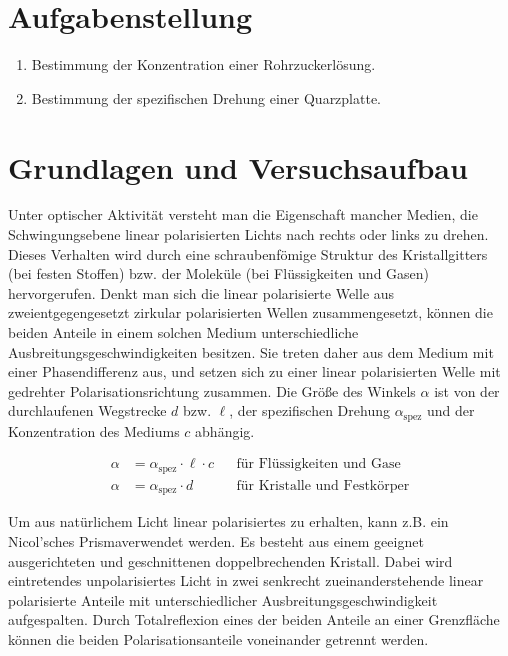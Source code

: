 \documentclass{article}
\newcommand{\as}{\alpha_\text{spez}}
\begin{document}
\parindent0cm




\pagestyle{fancy}

\section{Aufgabenstellung}

\begin{enumerate}
\item Bestimmung der Konzentration einer Rohrzuckerlösung.
\item Bestimmung der spezifischen Drehung einer Quarzplatte.
\end{enumerate}

\section{Grundlagen und Versuchsaufbau}

Unter optischer Aktivität versteht man die Eigenschaft mancher Medien, die Schwingungsebene linear polarisierten Lichts nach rechts oder links zu drehen. Dieses Verhalten wird durch eine schraubenfömige Struktur des Kristallgitters (bei festen Stoffen) bzw. der Moleküle (bei Flüssigkeiten und Gasen) hervorgerufen. Denkt man sich die linear polarisierte Welle aus zweientgegengesetzt zirkular polarisierten Wellen zusammengesetzt, können die beiden Anteile in einem solchen Medium unterschiedliche Ausbreitungsgeschwindigkeiten besitzen. Sie treten daher aus dem Medium mit einer Phasendifferenz aus, und setzen sich zu einer linear polarisierten Welle mit gedrehter Polarisationsrichtung zusammen. Die Größe des Winkels $\alpha$ ist von der durchlaufenen Wegstrecke $d$ bzw. $\ell$, der spezifischen Drehung $\as$ und der Konzentration des Mediums $c$ abhängig.

\begin{equation}
\label{eq:main}
\begin{aligned}
  \alpha &= \as\cdot \ell \cdot c && \text{für Flüssigkeiten und Gase} \\
  \alpha &= \as\cdot d && \text{für Kristalle und Festkörper}
\end{aligned}
\end{equation}

Um aus natürlichem Licht linear polarisiertes zu erhalten, kann z.B. ein Nicol'sches Prismaverwendet werden. Es besteht aus einem geeignet ausgerichteten und geschnittenen doppelbrechenden Kristall. Dabei wird eintretendes unpolarisiertes Licht in zwei senkrecht zueinanderstehende linear polarisierte Anteile mit unterschiedlicher Ausbreitungsgeschwindigkeit aufgespalten. Durch Totalreflexion eines der beiden Anteile an einer Grenzfläche können die beiden Polarisationsanteile voneinander getrennt werden.
\end{document}
